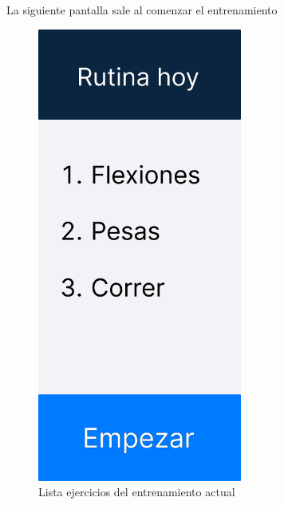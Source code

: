 La siguiente pantalla sale al comenzar el entrenamiento
\begin{figure}[H]
   \centering
    \includegraphics[width=0.6\textwidth]{fotos/Frame 1.png}
    \caption{Lista ejercicios del entrenamiento actual}
    \label{fig:Lista ejercicios del entrenamiento actual}
\end{figure}
